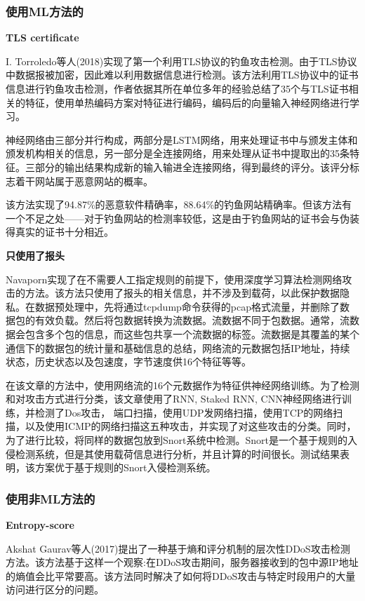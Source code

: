 \documentclass[12pt]{article} %
\begin{document}
\subsubsection{使用ML方法的}
\label{ml}

\textbf{TLS certificate}

I. Torroledo等人(2018)实现了第一个利用TLS协议的钓鱼攻击检测。由于TLS协议中数据报被加密，因此难以利用数据信息进行检测。该方法利用TLS协议中的证书信息进行钓鱼攻击检测，作者依据其所在单位多年的经验总结了35个与TLS证书相关的特征，使用单热编码方案对特征进行编码，编码后的向量输入神经网络进行学习。

神经网络由三部分并行构成，两部分是LSTM网络，用来处理证书中与颁发主体和颁发机构相关的信息，另一部分是全连接网络，用来处理从证书中提取出的35条特征。三部分的输出结果构成新的输入输进全连接网络，得到最终的评分。该评分标志着干网站属于恶意网站的概率。

该方法实现了94.87\%的恶意软件精确率，88.64\%的钓鱼网站精确率。但该方法有一个不足之处——对于钓鱼网站的检测率较低，这是由于钓鱼网站的证书会与伪装得真实的证书十分相近。

\textbf{只使用了报头}

Navaporn实现了在不需要人工指定规则的前提下，使用深度学习算法检测网络攻击的方法。该方法只使用了报头的相关信息，并不涉及到载荷，以此保护数据隐私。在数据预处理中，先将通过tcpdump命令获得的pcap格式流量，并删除了数据包的有效负载。然后将包数据转换为流数据。流数据不同于包数据。通常，流数据会包含多个包的信息，而这些包共享一个流数据的标签。流数据是其覆盖的某个通信下的数据包的统计量和基础信息的总结，网络流的元数据包括IP地址，持续状态，历史状态以及包速度，字节速度供16个特征等等。

在该文章的方法中，使用网络流的16个元数据作为特征供神经网络训练。为了检测和对攻击方式进行分类，该文章使用了RNN, Staked RNN, CNN神经网络进行训练，并检测了Dos攻击， 端口扫描，使用UDP发网络扫描，使用TCP的网络扫描，以及使用ICMP的网络扫描这五种攻击，并实现了对这些攻击的分类。同时，为了进行比较，将同样的数据包放到Snort系统中检测。Snort是一个基于规则的入侵检测系统，但是其使用载荷信息进行分析，并且计算的时间很长。测试结果表明，该方案优于基于规则的Snort入侵检测系统。

\subsubsection{使用非ML方法的}
\label{nonml}

\textbf{Entropy-score}

Akshat Gaurav等人(2017)提出了一种基于熵和评分机制的层次性DDoS攻击检测方法。该方法基于这样一个观察:在DDoS攻击期间，服务器接收到的包中源IP地址的熵值会比平常要高。该方法同时解决了如何将DDoS攻击与特定时段用户的大量访问进行区分的问题。
\end{document}
